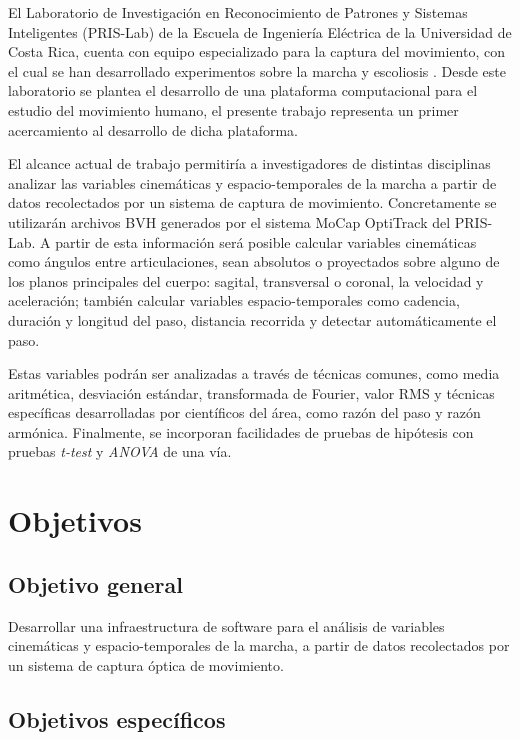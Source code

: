 El Laboratorio de Investigación en Reconocimiento de Patrones y Sistemas Inteligentes (PRIS-Lab) de la Escuela de Ingeniería Eléctrica de la Universidad de Costa Rica, cuenta con equipo especializado para la captura del movimiento, con el cual se han desarrollado experimentos sobre la marcha y escoliosis \citep{escoliosis}. Desde este laboratorio se plantea el desarrollo de una plataforma computacional para el estudio del movimiento humano, el presente trabajo representa un primer acercamiento al desarrollo de dicha plataforma.

El alcance actual de trabajo permitiría a investigadores de distintas disciplinas analizar las variables cinemáticas y espacio-temporales de la marcha a partir de datos recolectados por un sistema de captura de movimiento. Concretamente se utilizarán archivos BVH generados por el sistema MoCap OptiTrack del PRIS-Lab. A partir de esta información será posible calcular variables cinemáticas como ángulos entre articulaciones, sean absolutos o proyectados sobre alguno de los planos principales del cuerpo: sagital, transversal o coronal, la velocidad y aceleración; también calcular variables espacio-temporales como cadencia, duración y longitud del paso, distancia recorrida y detectar automáticamente el paso. 

Estas variables podrán ser analizadas a través de técnicas comunes, como media aritmética, desviación estándar, transformada de Fourier, valor RMS y técnicas específicas desarrolladas por científicos del área, como razón del paso y razón armónica. Finalmente, se incorporan facilidades de pruebas de hipótesis con pruebas \emph{t-test} y \emph{ANOVA} de una vía. 


\section{Objetivos}

\subsection{Objetivo general}

Desarrollar una infraestructura de software para el análisis de variables cinemáticas y espacio-temporales de la marcha, a partir de datos recolectados por un sistema de captura óptica de movimiento.

\subsection{Objetivos específicos}

